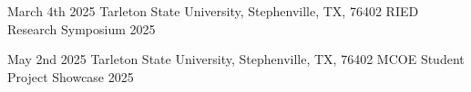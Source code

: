{March 4th}
{2025}
{Tarleton State University, Stephenville, TX, 76402}
{RIED Research Symposium 2025 }
{ }
{
\jbegin
\jend
}

{May 2nd}
{2025}
{Tarleton State University, Stephenville, TX, 76402}
{MCOE Student Project Showcase 2025}
{ }
{
\jbegin
\jend
}


\def\skills{
    \jbegin
        \setlength{\itemsep}{.1em} 
        \jitem{Operating Systems:  Windows 10, Windows 11, Ubuntu, CentOS}
        \jitem{Languages:   C, C++, Java, Python, SQL, JavaScript}
    \jend
}








